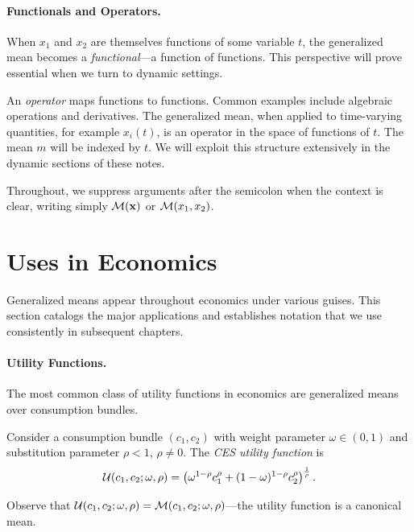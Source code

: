 \paragraph{Functionals and Operators.}

When $x_1$ and $x_2$ are themselves functions of some variable $t$, the generalized mean becomes a \emph{functional}---a function of functions. This perspective will prove essential when we turn to dynamic settings.

\begin{calloutnote}[Operators]
An \emph{operator} maps functions to functions. Common examples include algebraic operations and derivatives. The generalized mean, when applied to time-varying quantities, for example $x_i(t)$, is an operator in the space of functions of $t$. The mean $m$ will be indexed by $t$. We will exploit this structure extensively in the dynamic sections of these notes.
\end{calloutnote}

Throughout, we suppress arguments after the semicolon when the context is clear, writing simply $\mathcal{M}(\mathbf{x})$ or $\mathcal{M}(x_1, x_2)$.


\section{Uses in Economics}
\label{sec:ces-economics}

Generalized means appear throughout economics under various guises. This section catalogs the major applications and establishes notation that we use consistently in subsequent chapters.

\paragraph{Utility Functions.}

The most common class of utility functions in economics are generalized means over consumption bundles.

\begin{definition}
\label{def:ces-utility}
Consider a consumption bundle $(c_1, c_2)$ with weight parameter $\omega \in (0,1)$ and substitution parameter $\rho < 1$, $\rho \neq 0$. The \emph{CES utility function} is
\begin{equation*}
\label{eq:ces-utility}
\mathcal{U}(c_1, c_2; \omega, \rho) = \left( \omega^{1-\rho} c_1^\rho + (1-\omega)^{1-\rho} c_2^\rho \right)^{\frac{1}{\rho}}.
\end{equation*}
\end{definition}
Observe that $\mathcal{U}(c_1, c_2; \omega, \rho) = \mathcal{M}(c_1, c_2; \omega, \rho)$---the utility function is a canonical mean.

